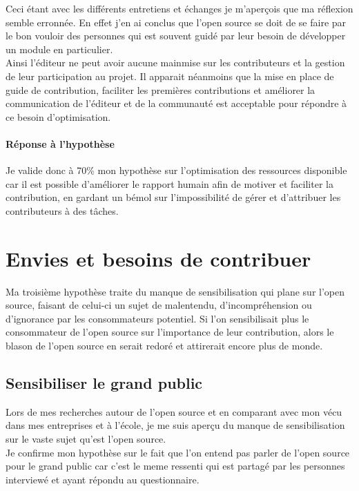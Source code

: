 		Ceci étant avec les différents entretiens et échanges je m'aperçois que ma réflexion semble erronnée.
		En effet j'en ai conclus que l'open source se doit de se faire par le bon vouloir des personnes qui est souvent guidé par leur besoin de développer un module en particulier.\\

		Ainsi l'éditeur ne peut avoir aucune mainmise sur les contributeurs et la gestion de leur participation au projet.
		Il apparait néanmoins que la mise en place de guide de contribution, faciliter les premières contributions et améliorer la communication de l'éditeur et de la communauté est acceptable pour répondre à ce besoin d'optimisation. 

\paragraph{Réponse à l'hypothèse\\}
	
	Je valide donc à 70\% mon hypothèse sur l'optimisation des ressources disponible car il est possible d'améliorer le rapport humain afin de motiver et faciliter la contribution, en gardant un bémol sur l'impossibilité de gérer et d'attribuer les contributeurs à des tâches.

\section{Envies et besoins de contribuer}

	Ma troisième hypothèse traite du manque de sensibilisation qui plane sur l'open source, faisant de celui-ci un sujet de malentendu, d'incompréhension ou d'ignorance par les consommateurs potentiel. Si l'on sensibilisait plus le consommateur de l'open source sur l'importance de leur contribution, alors le blason de l'open source en serait redoré et attirerait encore plus de monde.

	\subsection{Sensibiliser le grand public}

		Lors de mes recherches autour de l'open source et en comparant avec mon vécu dans mes entreprises et à l'école, je me suis aperçu du manque de sensibilisation sur le vaste sujet qu'est l'open source.\\

		Je confirme mon hypothèse sur le fait que l'on entend pas parler de l'open source pour le grand public car c'est le meme ressenti qui est partagé par les personnes interviewé et ayant répondu au questionnaire.\\

